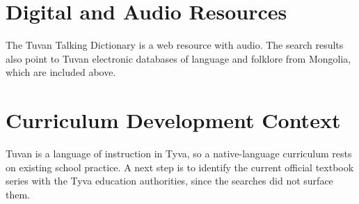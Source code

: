 \documentclass[12pt]{article}
\begin{document}
\section{Digital and Audio Resources}
The Tuvan Talking Dictionary is a web resource with audio. The search results also point to Tuvan electronic databases of language and folklore from Mongolia, which are included above.

\section{Curriculum Development Context}
Tuvan is a language of instruction in Tyva, so a native-language curriculum rests on existing school practice. A next step is to identify the current official textbook series with the Tyva education authorities, since the searches did not surface them.
\end{document}
